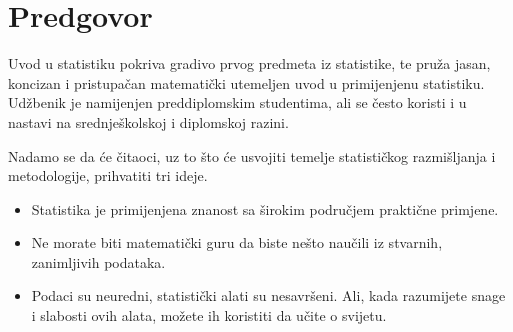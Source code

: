 \chapter*{{\color{oiB}Predgovor}}

\noindent%
	Uvod u statistiku pokriva gradivo prvog predmeta iz statistike, te pruža jasan, koncizan i pristupačan matematički utemeljen uvod u primijenjenu statistiku.
	Udžbenik je namijenjen preddiplomskim studentima, ali se često koristi i u nastavi na srednješkolskoj i diplomskoj razini.

%


\vspace{3mm}

	Nadamo se da će čitaoci, uz to što će usvojiti temelje statističkog razmišljanja i metodologije, prihvatiti tri ideje.\vspace{-1mm}
	\begin{itemize}
		\setlength{\itemsep}{0mm}
		\item
		Statistika je primijenjena znanost sa širokim područjem praktične primjene.
		\item
		Ne morate biti matematički guru da biste nešto naučili iz stvarnih, zanimljivih podataka.
		\item
		Podaci su neuredni, statistički alati su nesavršeni.
		Ali, kada razumijete snage i slabosti ovih alata, možete ih koristiti da učite o svijetu.
	\end{itemize}



